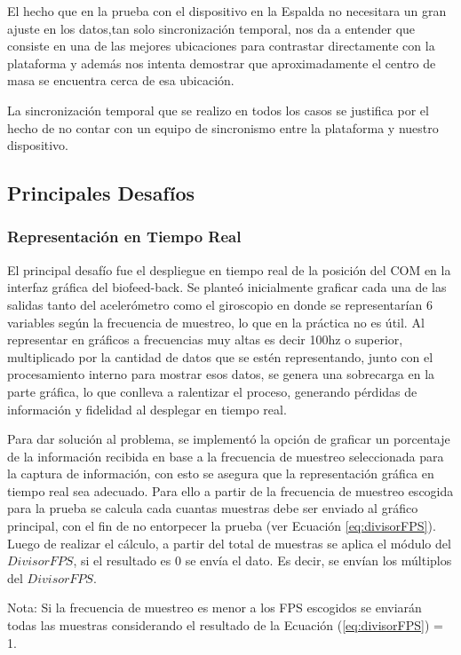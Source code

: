 \documentclass[12pt,a4paper]{article}
\begin{document}
El hecho que en la prueba con el dispositivo en la Espalda no necesitara un gran ajuste en los datos,tan solo sincronización temporal, nos da a entender que consiste en una de las mejores ubicaciones para contrastar directamente con la plataforma y además nos intenta demostrar que aproximadamente el centro de masa se encuentra cerca de esa ubicación.

La sincronización temporal que se realizo en todos los casos se justifica por el hecho de no contar con un equipo de sincronismo entre la plataforma y nuestro dispositivo.

\newpage
\subsection{Principales Desafíos}
\subsubsection{Representación en Tiempo Real}
El principal desafío fue el despliegue en tiempo real de la posición del COM en la interfaz gráfica del biofeed-back. Se planteó inicialmente graficar cada una de las salidas tanto del acelerómetro como el giroscopio en donde se representarían 6 variables según la frecuencia de muestreo, lo que en la práctica no es útil. Al representar en gráficos a frecuencias muy altas es decir 100hz o superior, multiplicado por la cantidad de datos que se estén representando, junto con el procesamiento interno para mostrar esos datos, se genera una sobrecarga en la parte gráfica, lo que conlleva a ralentizar el proceso, generando pérdidas de información y fidelidad al desplegar en tiempo real.

Para dar solución al problema, se implementó la opción de graficar un porcentaje de la información recibida en base a la frecuencia de muestreo seleccionada para la captura de información, con esto se asegura que la representación gráfica en tiempo real sea adecuado. Para ello a partir de la frecuencia de muestreo escogida para la prueba se calcula cada cuantas muestras debe ser enviado al gráfico principal, con el fin de no entorpecer la prueba (ver Ecuación \ref{eq:divisorFPS}). 
Luego de realizar el cálculo, a partir del total de muestras se aplica el módulo del $DivisorFPS$, si el resultado es 0 se envía el dato. Es decir, se envían los múltiplos del $DivisorFPS$.

Nota: Si la frecuencia de muestreo es menor a los FPS escogidos se enviarán todas las muestras considerando el resultado de la Ecuación (\ref{eq:divisorFPS}) = 1.
\end{document}
